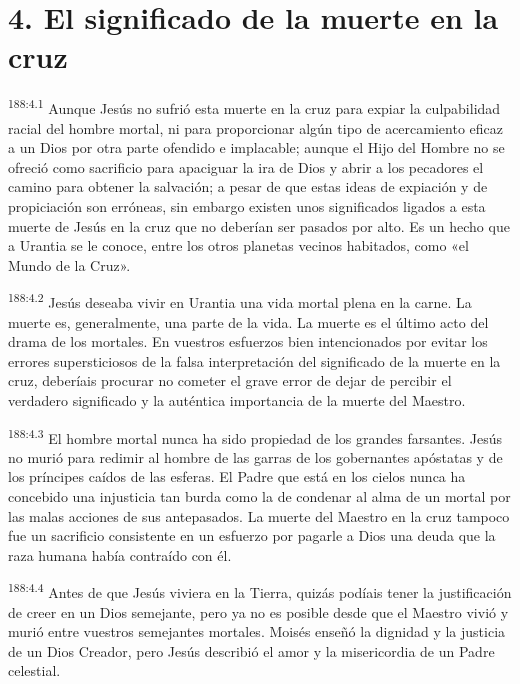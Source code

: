 \section*{4. El significado de la muerte en la cruz}
\par 
\textsuperscript{188:4.1} Aunque Jesús no sufrió esta muerte en la cruz para expiar la culpabilidad racial del hombre mortal, ni para proporcionar algún tipo de acercamiento eficaz a un Dios por otra parte ofendido e implacable; aunque el Hijo del Hombre no se ofreció como sacrificio para apaciguar la ira de Dios y abrir a los pecadores el camino para obtener la salvación; a pesar de que estas ideas de expiación y de propiciación son erróneas, sin embargo existen unos significados ligados a esta muerte de Jesús en la cruz que no deberían ser pasados por alto. Es un hecho que a Urantia se le conoce, entre los otros planetas vecinos habitados, como «el Mundo de la Cruz».

\par 
\textsuperscript{188:4.2} Jesús deseaba vivir en Urantia una vida mortal plena en la carne. La muerte es, generalmente, una parte de la vida. La muerte es el último acto del drama de los mortales. En vuestros esfuerzos bien intencionados por evitar los errores supersticiosos de la falsa interpretación del significado de la muerte en la cruz, deberíais procurar no cometer el grave error de dejar de percibir el verdadero significado y la auténtica importancia de la muerte del Maestro.

\par 
\textsuperscript{188:4.3} El hombre mortal nunca ha sido propiedad de los grandes farsantes. Jesús no murió para redimir al hombre de las garras de los gobernantes apóstatas y de los príncipes caídos de las esferas. El Padre que está en los cielos nunca ha concebido una injusticia tan burda como la de condenar al alma de un mortal por las malas acciones de sus antepasados. La muerte del Maestro en la cruz tampoco fue un sacrificio consistente en un esfuerzo por pagarle a Dios una deuda que la raza humana había contraído con él.

\par 
\textsuperscript{188:4.4} Antes de que Jesús viviera en la Tierra, quizás podíais tener la justificación de creer en un Dios semejante, pero ya no es posible desde que el Maestro vivió y murió entre vuestros semejantes mortales. Moisés enseñó la dignidad y la justicia de un Dios Creador, pero Jesús describió el amor y la misericordia de un Padre celestial.

